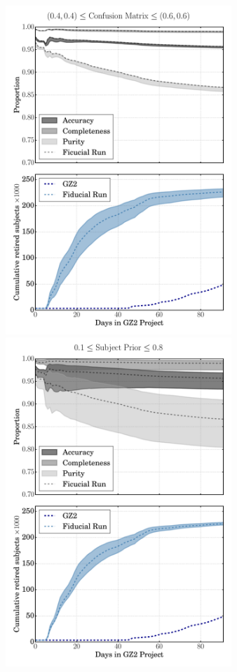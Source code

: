 \documentclass[twocolumn]{aastex6}
\begin{document}
\begin{figure}[t]
\includegraphics[width=3.35in]{figures/GZX_eval_and_retirement_PLPD_spread_4paper_v2.pdf}
\includegraphics[width=3.35in]{figures/GZX_eval_and_retirement_prior_spread_4paper_v2.pdf}

\end{figure}
\end{document}
